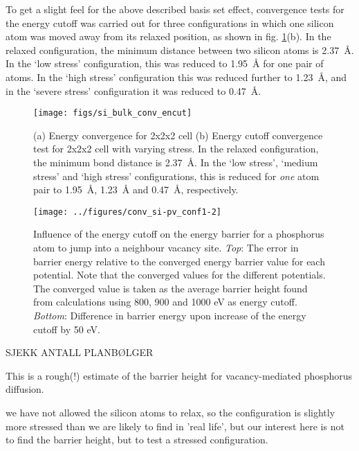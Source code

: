 \documentclass[11pt]{scrbook}   %
\begin{document}
To get a slight feel for the above described basis set effect, convergence tests for the energy cutoff was carried out for 
three configurations in which one silicon atom was moved away from its relaxed position, as shown in fig. \ref{fig:figs/si64_bulk_conv_encut_stress}(b).
In the relaxed configuration, the minimum distance between two silicon atoms is \SI{2.37}{\angstrom}. 
In the `low stress' configuration, this was reduced to \SI{1.95}{\angstrom} for one pair of atoms. 
In the `high stress' configuration this was reduced further to \SI{1.23}{\angstrom}, and in the `severe stress' configuration it was reduced to \SI{0.47}{\angstrom}.

\begin{figure}[htbp]
  \begin{center}
    \texttt{[image: figs/si\_bulk\_conv\_encut]}
  \end{center}
  \caption{
  (a) Energy convergence for 2x2x2 cell
  (b) Energy cutoff convergence test for 2x2x2 cell with varying stress. In the relaxed configuration, the minimum bond distance
  is \SI{2.37}{\angstrom}. In the `low stress', `medium stress' and `high stress' configurations, this is reduced for 
  \emph{one} atom pair to \SI{1.95}{\angstrom}, \SI{1.23}{\angstrom} and \SI{0.47}{\angstrom}, respectively.}
  \label{fig:figs/si64_bulk_conv_encut_stress}
\end{figure}

\begin{figure}[htbp]
  \begin{center}
    \texttt{[image: ../figures/conv\_si-pv\_conf1-2]}
  \end{center}
  \caption{Influence of the energy cutoff on the energy barrier for a phosphorus atom to jump into a neighbour vacancy site. 
  \textit{Top}: The error in barrier energy relative to the converged energy barrier value for each potential. 
  Note that the converged values for the different potentials.
  The converged value is taken as the average barrier height found from calculations using 800, 900 and 1000 eV as energy cutoff.
  \textit{Bottom}: Difference in barrier energy upon increase of the energy cutoff by 50 eV.}
  \label{fig:figs/conv_si-pv_conf1-2}
\end{figure}


SJEKK ANTALL PLANBØLGER

This is a rough(!) estimate of the barrier height for vacancy-mediated phosphorus diffusion.

we have not allowed the silicon atoms to relax, so the configuration is slightly more stressed than 
we are likely to find in 'real life', but our interest here is not to find the barrier height, but 
to test a stressed configuration.
\end{document}
